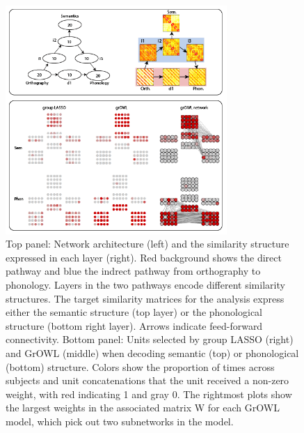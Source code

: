 \begin{figure}[!t]
\centering
\includegraphics[width=0.75\textwidth]{figures/Network_results.png}
\caption{Top panel: Network architecture (left) and the similarity structure expressed in each layer (right). Red background shows the direct pathway and blue the indrect pathway from orthography to phonology. Layers in the two pathways encode different similarity structures. The target similarity matrices for the analysis express either the semantic structure (top layer) or the phonological structure (bottom right layer). Arrows indicate feed-forward connectivity. Bottom panel: Units selected by group LASSO (right) and GrOWL (middle) when decoding semantic (top) or phonological (bottom) structure. Colors show the proportion of times across subjects and unit concatenations that the unit received a non-zero weight, with red indicating 1 and gray 0. The rightmost plots show the largest weights in the associated matrix W for each GrOWL model, which pick out two subnetworks in the model.}
\label{fig.network}
\end{figure}  

